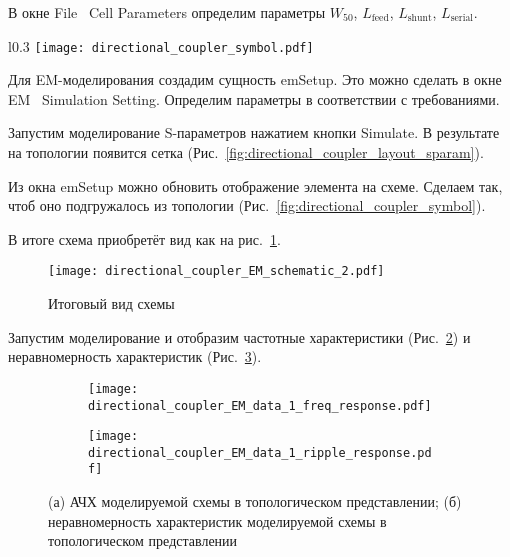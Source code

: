 В окне File \textrightarrow\ Cell Parameters определим параметры $W_{50}$, $L_\text{feed}$, $L_\text{shunt}$, $L_\text{serial}$.

\begin{wrapfigure}{l}{0.3\textwidth}
    \centering
    \texttt{[image: directional\_coupler\_symbol.pdf]}
    \caption{Обновлённый символ}%
    \label{fig:directional_coupler_symbol}
\end{wrapfigure}

Для EM-моделирования создадим сущность emSetup.
Это можно сделать в окне EM \textrightarrow\ Simulation Setting.
Определим параметры в соответствии с требованиями.

Запустим моделирование S-параметров нажатием кнопки Simulate.
В результате на топологии появится сетка (Рис.~\ref{fig:directional_coupler_layout_sparam}).

Из окна emSetup можно обновить отображение элемента на схеме.
Сделаем так, чтоб оно подгружалось из топологии (Рис.~\ref{fig:directional_coupler_symbol}).

В итоге схема приобретёт вид как на рис.~\ref{fig:directional_coupler_EM_schematic_2}.

\begin{figure}[!ht]
    \centering
    \texttt{[image: directional\_coupler\_EM\_schematic\_2.pdf]}
    \caption{Итоговый вид схемы}%
    \label{fig:directional_coupler_EM_schematic_2}
\end{figure}

Запустим моделирование и отобразим частотные характеристики (Рис.~\ref{fig:directional_coupler_EM_data_1_freq_response}) и неравномерность характеристик (Рис.~\ref{fig:directional_coupler_EM_data_1_ripple_response}).

\begin{figure}[!ht]
    \begin{subfigure}[b]{0.45\textwidth}
        \centering
        \texttt{[image: directional\_coupler\_EM\_data\_1\_freq\_response.pdf]}
        \caption{}%
        \label{fig:directional_coupler_EM_data_1_freq_response}
    \end{subfigure}
    \hfill
    \begin{subfigure}[b]{0.45\textwidth}
        \centering
        \texttt{[image: directional\_coupler\_EM\_data\_1\_ripple\_response.pdf]}
        \caption{}%
        \label{fig:directional_coupler_EM_data_1_ripple_response}
    \end{subfigure}
    \caption{%
        (а) АЧХ моделируемой схемы в топологическом представлении;
        (б) неравномерность характеристик моделируемой схемы в топологическом представлении
    }%
    \label{fig:directional_coupler_EM_data_1}
\end{figure}
